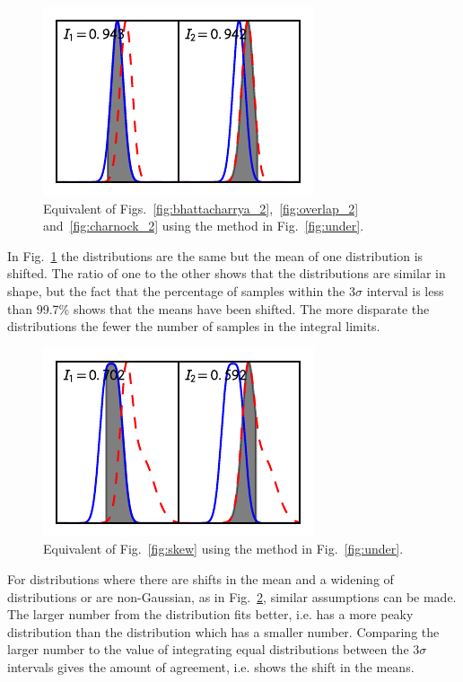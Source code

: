 \documentclass[twocolumn]{revtex4-1}
\begin{document}
    \begin{figure}
        \centering
        \includegraphics{../comparison/plots/under_2.pdf}
        \caption{Equivalent of Figs.~\ref{fig:bhattacharrya_2},~\ref{fig:overlap_2} and~\ref{fig:charnock_2} using the method in Fig.~\ref{fig:under}.}
        \label{fig:under_2}
    \end{figure}
    \noindent In Fig.~\ref{fig:under_2} the distributions are the same but the mean of one distribution is shifted.
    The ratio of one to the other shows that the distributions are similar in shape, but the fact that the percentage of samples within the $3\sigma$ interval is less than 99.7\% shows that the means have been shifted.
    The more disparate the distributions the fewer the number of samples in the integral limits.
    \begin{figure}
        \centering
        \includegraphics{../comparison/plots/under_skew.pdf}
        \caption{Equivalent of Fig.~\ref{fig:skew} using the method in Fig.~\ref{fig:under}.}
        \label{fig:under_skew}
    \end{figure}
    \noindent For distributions where there are shifts in the mean and a widening of distributions or are non-Gaussian, as in Fig.~\ref{fig:under_skew}, similar assumptions can be made.
    The larger number from the distribution fits better, i.e. has a more peaky distribution than the distribution which has a smaller number.
    Comparing the larger number to the value of integrating equal distributions between the $3\sigma$ intervals gives the amount of agreement, i.e. shows the shift in the means.
\end{document}
